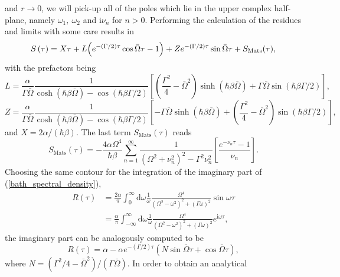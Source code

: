 and $r\rightarrow 0$, we will pick-up all of the poles which lie in the upper complex half-plane,
namely $\omega_1, \ \omega_2$ and $\text{i}\nu_n$ for $n > 0$. Performing the calculation 
of the residues and limits with some care results in
%
\begin{equation}
    S \left( \tau \right) = X\tau + L \Bigl( e^{-(\Gamma/2)\tau} \cos\bar{\Omega}\tau -1 \Bigr)
    + Z e^{-(\Gamma/2)\tau} \sin\bar{\Omega}\tau + S_{\text{Mats}}(\tau),
\end{equation}
%
with the prefactors being
%
\begin{equation}
    L = \frac{\alpha}{\Gamma\bar{\Omega}} \frac{1}{\cosh(\hbar\beta\bar{\Omega})-\cos(\hbar\beta\Gamma/2)}
    \left[ \left( \frac{\Gamma^2}{4}-\bar{\Omega}^2 \right) \sinh(\hbar\beta\bar{\Omega})
    + \Gamma\bar{\Omega} \sin(\hbar\beta\Gamma/2)  \right],
\end{equation}
%
\begin{equation}
    Z = \frac{\alpha}{\Gamma\bar{\Omega}} \frac{1}{\cosh(\hbar\beta\bar{\Omega})-\cos(\hbar\beta\Gamma/2)}
    \left[ -\Gamma\bar{\Omega} \sinh(\hbar\beta\bar{\Omega})
    + \left( \frac{\Gamma^2}{4}-\bar{\Omega}^2 \right) \sin(\hbar\beta\Gamma/2)  \right],
\end{equation}
%
and $X=2\alpha/(\hbar\beta)$. The last term $S_{\text{Mats}}(\tau)$ reads
%
\begin{equation}
    S_{\text{Mats}}(\tau) = -\frac{4\alpha\Omega^4}{\hbar\beta}
    \sum_{n=1}^{\infty}\frac{1}{(\Omega^2+\nu_n^2)^2-\Gamma^2\nu_n^2}
    \left[ \frac{e^{-\nu_n\tau}-1}{\nu_n} \right].
\end{equation}
%
Choosing the same contour for the integration of the imaginary part of (\ref{bath_spectral_density}),
%
\begin{align}
    R(\tau) &= \frac{2 \alpha}{\pi} 
    \int_{0}^{\infty} \text{d}\omega \frac{1}{\omega} \frac{\Omega^4}{\left(\Omega^2-\omega^2\right)^2
    + \left(\Gamma\omega\right)^2}\sin\omega\tau \\
    &= \frac{\alpha}{\pi} 
    \int_{-\infty}^{\infty} \text{d}\omega \frac{1}{\omega} \frac{\Omega^4}{\left(\Omega^2-\omega^2\right)^2
    + \left(\Gamma\omega\right)^2}e^{\text{i}\omega\tau},
\end{align}
%
the imaginary part can be analogously computed to be
%
\begin{equation}
    R(\tau) = \alpha - \alpha e^{-(\Gamma/2)\tau} \left( N\sin\bar{\Omega}\tau +\cos\bar{\Omega}\tau \right),
\end{equation}
%
where $N=(\Gamma^2/4-\bar{\Omega}^2)/(\Gamma\bar{\Omega})$. In order to obtain an analytical
